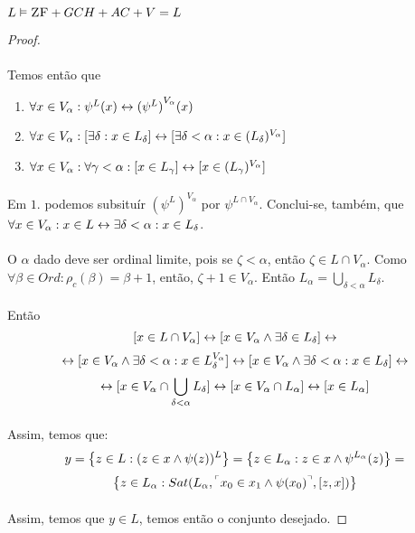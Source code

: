\begin{theorem}{$L\vDash\text{\sc ZF}+GCH+AC+V=L$}
\begin{proof}
                \paragraph{}
                    Temos então que
                \begin{enumerate}
                    \item $\forall x\in V_\alpha: \psi^L(x) \leftrightarrow {(\psi^L)}^{V_\alpha}(x)$
                    \item $\forall x\in V_\alpha:[\exists\delta :x\in L_\delta] \leftrightarrow [\exists\delta<\alpha :x\in (L_\delta)^{V_\alpha}]$
                    \item $\forall x\in V_\alpha: \forall\gamma<\alpha: [x\in L_\gamma] \leftrightarrow [x\in (L_\gamma)^{V_\alpha}]$
                \end{enumerate}
                \paragraph{}
                    Em $1.$ podemos subsituír ${(\psi^L)}^{V_\alpha}$ por $\psi^{L\cap V_\alpha}$. Conclui-se, também, que 
                    $\forall x\in V_\alpha:x\in L\leftrightarrow\exists\delta<\alpha:x\in L_\delta$.
                \paragraph{}
                    O $\alpha$ dado deve ser ordinal limite, pois se $\zeta<\alpha$, então $\zeta\in L\cap V_\alpha$. Como $\forall\beta\in 
                    Ord:\rho_c(\beta) = \beta+1$, então, $\zeta+1\in V_\alpha$. Então $L_\alpha = \bigcup_{\delta < \alpha}L_\delta$.
                \paragraph{}
                    Então 
                    $$
                            [x\in L\cap V_\alpha]\leftrightarrow[x\in V_\alpha\land\exists\delta\in L_\delta]\leftrightarrow
                    $$ $$
                        \leftrightarrow[x\in V_\alpha\land\exists\delta<\alpha:x\in L_\delta^{V_\alpha}]\leftrightarrow[x\in V_\alpha\land\exists\delta<\alpha:x\in L_\delta]\leftrightarrow
                    $$ $$
                        \leftrightarrow[x\in V_\alpha\cap\bigcup_{\delta<\alpha}L_\delta]\leftrightarrow[x\in V_\alpha\cap L_\alpha]\leftrightarrow[x\in L_\alpha]
                    $$
                \paragraph{}
                    Assim, temos que:
                    $$y=\SET{z\in L:(z\in x\land\psi(z))^L} = \SET{z\in L_\alpha:z\in x\land\psi^{L_\alpha}(z)} =$$
                    $$\SET{z\in L_\alpha:Sat(L_\alpha, \FMLA{x_0\in x_1\land\psi(x_0)},[z, x])}$$
                \paragraph{}
                    Assim, temos que $y\in L$, temos então o conjunto desejado.
                \eop
                \end{proof}
            \end{theorem}
